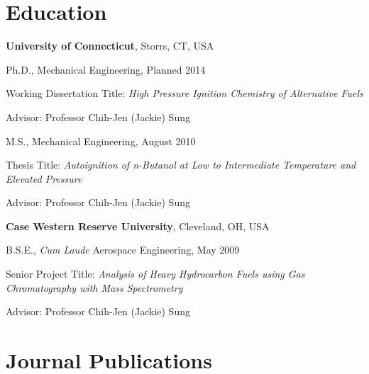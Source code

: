 \section{Education}

\textbf{University of Connecticut}, Storrs, CT, USA
\begin{outerlist}

\item[] Ph.D., Mechanical Engineering, Planned 2014
        \begin{innerlist}
        \item[] Working Dissertation Title: \textit{High Pressure
                Ignition Chemistry of Alternative Fuels}
        \item[] Advisor: Professor Chih-Jen (Jackie) Sung
        \end{innerlist}

\item[] M.S., Mechanical Engineering, August 2010
        \begin{innerlist}
        \item[] Thesis Title: \textit{Autoignition of n-Butanol at Low
                to Intermediate Temperature and Elevated Pressure}
        \item[] Advisor: Professor Chih-Jen (Jackie) Sung
        \end{innerlist}

\end{outerlist}
\vspace{0.1in}
\textbf{Case Western Reserve University}, Cleveland, OH, USA
\begin{outerlist}

\item[] B.S.E., \textit{Cum Laude} Aerospace Engineering, May 2009
        \begin{innerlist}
        \item[] Senior Project Title: \textit{Analysis of Heavy
                Hydrocarbon Fuels using Gas Chromatography with Mass
                Spectrometry}
        \item[] Advisor: Professor Chih-Jen (Jackie) Sung
        \end{innerlist}

\end{outerlist}

\section{Journal Publications}

